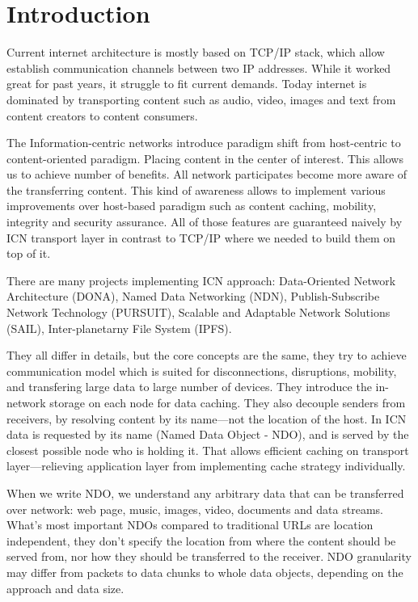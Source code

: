 \documentclass[nostrict]{szablonPG}
\begin{document}
\section{Introduction}
Current internet architecture is mostly based on TCP/IP stack, which allow  establish communication channels between two IP addresses. While it worked great for past years, it struggle to fit current demands. Today internet is dominated by transporting content such as audio, video, images and text from content creators to content consumers. 

The Information-centric networks introduce paradigm shift from host-centric to content-oriented paradigm. Placing content in the center of interest. This allows us to achieve number of benefits. All network participates become more aware of the transferring content. This kind of awareness allows to implement various improvements over host-based paradigm such as content caching, mobility, integrity and security assurance. All of those features are guaranteed naively by ICN transport layer in contrast to TCP/IP where we needed to build them on top of it. 

There are many projects implementing ICN approach: Data-Oriented Network Architecture (DONA), Named Data Networking (NDN), Publish-Subscribe Network Technology (PURSUIT), Scalable and Adaptable Network Solutions (SAIL), Inter-planetarny File System (IPFS).

They all differ in details, but the core concepts are the same, they try to achieve communication model which is suited for disconnections, disruptions, mobility, and transfering large data to large number of devices. They introduce the in-network storage on each node for data caching. They also decouple senders from receivers, by resolving content by its name---not the location of the host. 
In ICN data is requested by its name (Named Data Object - NDO), and is served by the closest possible node who is holding it. That allows efficient caching on transport layer---relieving application layer from implementing cache strategy individually. 

When we write NDO, we understand any arbitrary data that can be transferred over network: web page, music, images, video, documents and data streams. What's most important NDOs compared to traditional URLs are location independent, they don't specify the location from where the content should be served from, nor how they should be transferred to the receiver. NDO granularity may differ from packets to data chunks to whole data objects, depending on the approach and data size.
\end{document}
